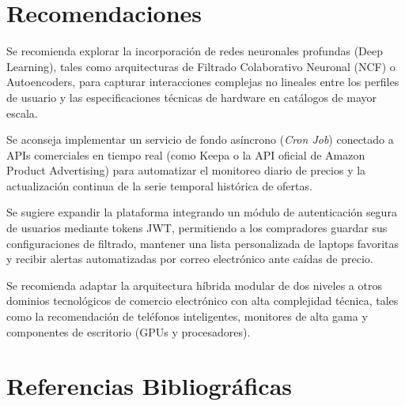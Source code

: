 \documentclass[12pt,a4paper]{article}
\begin{document}
\section{Recomendaciones}

Se recomienda explorar la incorporación de redes neuronales profundas (Deep Learning), tales como arquitecturas de Filtrado Colaborativo Neuronal (NCF) o Autoencoders, para capturar interacciones complejas no lineales entre los perfiles de usuario y las especificaciones técnicas de hardware en catálogos de mayor escala.

Se aconseja implementar un servicio de fondo asíncrono (\textit{Cron Job}) conectado a APIs comerciales en tiempo real (como Keepa o la API oficial de Amazon Product Advertising) para automatizar el monitoreo diario de precios y la actualización continua de la serie temporal histórica de ofertas.

Se sugiere expandir la plataforma integrando un módulo de autenticación segura de usuarios mediante tokens JWT, permitiendo a los compradores guardar sus configuraciones de filtrado, mantener una lista personalizada de laptops favoritas y recibir alertas automatizadas por correo electrónico ante caídas de precio.

Se recomienda adaptar la arquitectura híbrida modular de dos niveles a otros dominios tecnológicos de comercio electrónico con alta complejidad técnica, tales como la recomendación de teléfonos inteligentes, monitores de alta gama y componentes de escritorio (GPUs y procesadores).

\section{Referencias Bibliográficas}
\end{document}
